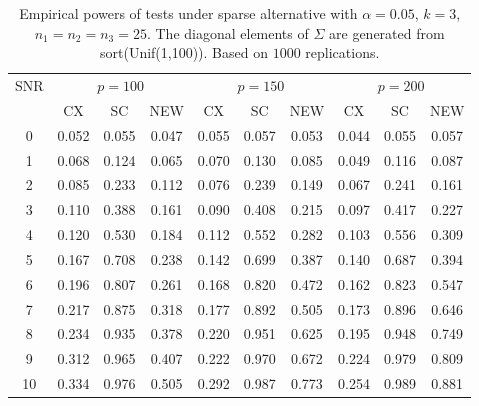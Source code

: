 \documentclass{beamer}
\theoremstyle{plain}
\theoremstyle{definition}
\theoremstyle{remark}
\begin{document}
\begin{frame}
\begin{table}[!hbp]\scriptsize
    \caption{Empirical powers of tests under sparse alternative with $\alpha=0.05$, $k=3$, $n_1=n_2=n_3=25$. The diagonal elements of $\Sigma$ are generated from sort(Unif(1,100)). Based on $1000$ replications.}
    \centering
\begin{tabular}{*{10}{c}}
\toprule
\multirow{2}{*}{SNR} &\multicolumn{3}{c}{$p=100$}&\multicolumn{3}{c}{$p=150$}&\multicolumn{3}{c}{$p=200$} \\
    \cmidrule(r){2-4}\cmidrule(r){5-7}\cmidrule(r){8-10}
        & CX & SC & NEW & CX &SC &NEW &CX & SC & NEW\\
\midrule
0 & 0.052 & 0.055 & 0.047 & 0.055 & 0.057 & 0.053 & 0.044 & 0.055 & 0.057 \\ 
1 & 0.068 & 0.124 & 0.065 & 0.070 & 0.130 & 0.085 & 0.049 & 0.116 & 0.087 \\ 
2 & 0.085 & 0.233 & 0.112 & 0.076 & 0.239 & 0.149 & 0.067 & 0.241 & 0.161 \\ 
3 & 0.110 & 0.388 & 0.161 & 0.090 & 0.408 & 0.215 & 0.097 & 0.417 & 0.227 \\ 
4 & 0.120 & 0.530 & 0.184 & 0.112 & 0.552 & 0.282 & 0.103 & 0.556 & 0.309 \\ 
5 & 0.167 & 0.708 & 0.238 & 0.142 & 0.699 & 0.387 & 0.140 & 0.687 & 0.394 \\ 
6 & 0.196 & 0.807 & 0.261 & 0.168 & 0.820 & 0.472 & 0.162 & 0.823 & 0.547 \\ 
7 & 0.217 & 0.875 & 0.318 & 0.177 & 0.892 & 0.505 & 0.173 & 0.896 & 0.646 \\ 
8 & 0.234 & 0.935 & 0.378 & 0.220 & 0.951 & 0.625 & 0.195 & 0.948 & 0.749 \\ 
9 & 0.312 & 0.965 & 0.407 & 0.222 & 0.970 & 0.672 & 0.224 & 0.979 & 0.809 \\ 
10 & 0.334 & 0.976 & 0.505 & 0.292 & 0.987 & 0.773 & 0.254 & 0.989 & 0.881 \\ 
\bottomrule
\end{tabular}
\end{table}
\end{frame}
\end{document}

